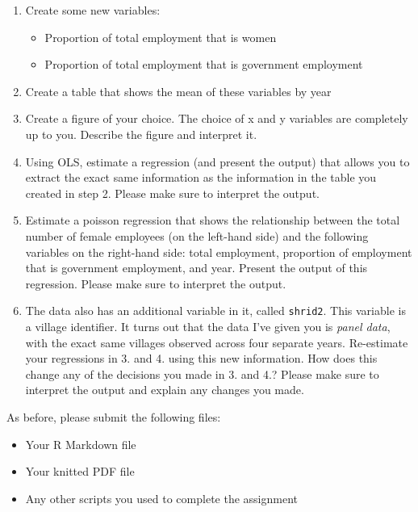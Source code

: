 \documentclass[
]{article}
\providecommand{\tightlist}{%
  \setlength{\itemsep}{0pt}\setlength{\parskip}{0pt}}
\begin{document}
\begin{enumerate}
\def\labelenumi{\arabic{enumi}.}
\tightlist
\item
  Create some new variables:

  \begin{itemize}
  \tightlist
  \item
    Proportion of total employment that is women
  \item
    Proportion of total employment that is government employment
  \end{itemize}
\item
  Create a table that shows the mean of these variables by year
\item
  Create a figure of your choice. The choice of x and y variables are completely up to you. Describe the figure and interpret it.
\item
  Using OLS, estimate a regression (and present the output) that allows you to extract the exact same information as the information in the table you created in step 2. Please make sure to interpret the output.
\item
  Estimate a poisson regression that shows the relationship between the total number of female employees (on the left-hand side) and the following variables on the right-hand side: total employment, proportion of employment that is government employment, and year. Present the output of this regression. Please make sure to interpret the output.
\item
  The data also has an additional variable in it, called \texttt{shrid2}. This variable is a village identifier. It turns out that the data I've given you is \emph{panel data}, with the exact same villages observed across four separate years. Re-estimate your regressions in 3. and 4. using this new information. How does this change any of the decisions you made in 3. and 4.? Please make sure to interpret the output and explain any changes you made.
\end{enumerate}

As before, please submit the following files:

\begin{itemize}
\tightlist
\item
  Your R Markdown file
\item
  Your knitted PDF file
\item
  Any other scripts you used to complete the assignment
\end{itemize}
\end{document}
